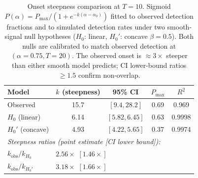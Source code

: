 \begin{table}[h]
\centering
\small
\caption{Onset steepness comparison at $T{=}10$. Sigmoid $P(\alpha) = P_{\max} / (1 + e^{-k(\alpha - \alpha_0)})$ fitted to observed detection fractions and to simulated detection rates under two smooth-signal null hypotheses ($H_0$: linear, $H_0'$: concave $\beta{=}0.5$). Both nulls are calibrated to match observed detection at $(\alpha{=}0.75, T{=}20)$. The observed onset is ${\approx}3{\times}$ steeper than either smooth model predicts; CI lower-bound ratios ${\geq}1.5$ confirm non-overlap.}
\label{tab:steepness}
\begin{tabular}{lcccc}
\toprule
Model & $k$ (steepness) & 95\% CI & $P_{\max}$ & $R^2$ \\
\midrule
Observed           & 15.7  & $[9.4, 28.2]$   & 0.69 & 0.969 \\
$H_0$ (linear)     & 6.14  & $[5.82, 6.45]$  & 0.63 & 0.9998 \\
$H_0'$ (concave)   & 4.93  & $[4.22, 5.65]$  & 0.37 & 0.9974 \\
\midrule
\multicolumn{5}{l}{\textit{Steepness ratios (point estimate [CI lower bound]):}} \\
$k_{\text{obs}} / k_{H_0}$   & \multicolumn{4}{l}{$2.56\times$ $[1.46\times]$} \\
$k_{\text{obs}} / k_{H_0'}$  & \multicolumn{4}{l}{$3.18\times$ $[1.66\times]$} \\
\bottomrule
\end{tabular}
\end{table}
